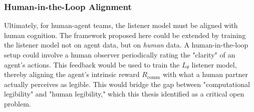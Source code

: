 \documentclass[12pt, a4paper]{report}
\newcommand{\Rcomm}{R_{\text{comm}}}
\begin{document}
\subsubsection{Human-in-the-Loop Alignment}
Ultimately, for human-agent teams, the listener model must be aligned with human cognition. The framework proposed here could be extended by training the listener model not on agent data, but on \textit{human} data. A human-in-the-loop setup could involve a human observer periodically rating the "clarity" of an agent's actions. This feedback would be used to train the $L_{\theta}$ listener model, thereby aligning the agent's intrinsic reward $\Rcomm$ with what a human partner actually perceives as legible. This would bridge the gap between "computational legibility" and "human legibility," which this thesis identified as a critical open problem.


\printbibliography[title={Bibliography}]


\appendix
\end{document}
